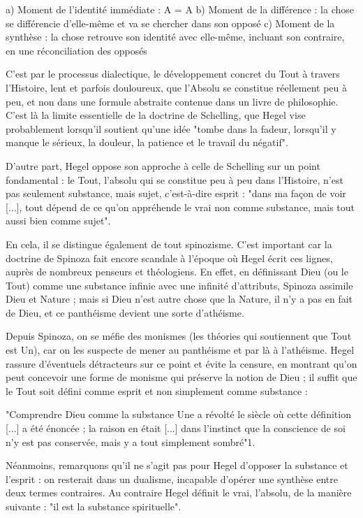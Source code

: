 a) Moment de l’identité immédiate : A = A
b) Moment de la différence : la chose se différencie d’elle-même et va se chercher dans son opposé
c) Moment de la synthèse : la chose retrouve son identité avec elle-même, incluant son contraire, en une réconciliation des opposés

C’est par le processus dialectique, le développement concret du Tout à travers l’Histoire, lent et parfois douloureux, que l’Absolu se constitue réellement peu à peu, et non dans une formule abstraite contenue dans un livre de philosophie. C’est là la limite essentielle de la doctrine de Schelling, que Hegel vise probablement lorsqu’il soutient qu’une idée "tombe dans la fadeur, lorsqu’il y manque le sérieux, la douleur, la patience et le travail du négatif".

D’autre part, Hegel oppose son approche à celle de Schelling sur un point fondamental : le Tout, l’absolu qui se constitue peu à peu dans l’Histoire, n’est pas seulement substance, mais sujet, c’est-à-dire esprit : "dans ma façon de voir [...], tout dépend de ce qu’on appréhende le vrai non comme substance, mais tout aussi bien comme sujet".

En cela, il se distingue également de tout spinozisme. C’est important car la doctrine de Spinoza fait encore scandale à l’époque où Hegel écrit ces lignes, auprès de nombreux penseurs et théologiens. En effet, en définissant Dieu (ou le Tout) comme une substance infinie avec une infinité d’attributs, Spinoza assimile Dieu et Nature ; mais si Dieu n’est autre chose que la Nature, il n’y a pas en fait de Dieu, et ce panthéisme devient une sorte d’athéisme.

Depuis Spinoza, on se méfie des monismes (les théories qui soutiennent que Tout est Un), car on les suspecte de mener au panthéisme et par là à l’athéisme. Hegel rassure d’éventuels détracteurs sur ce point et évite la censure, en montrant qu’on peut concevoir une forme de monisme qui préserve la notion de Dieu ; il suffit que le Tout soit défini comme esprit et non simplement comme substance :

"Comprendre Dieu comme la substance Une a révolté le siècle où cette définition [...] a été énoncée ; la raison en était [...] dans l’instinct que la conscience de soi n’y est pas conservée, mais y a tout simplement sombré"1.

Néanmoins, remarquons qu’il ne s’agit pas pour Hegel d’opposer la substance et l’esprit : on resterait dans un dualisme, incapable d’opérer une synthèse entre deux termes contraires. Au contraire Hegel définit le vrai, l’absolu, de la manière suivante : "il est la substance spirituelle".

